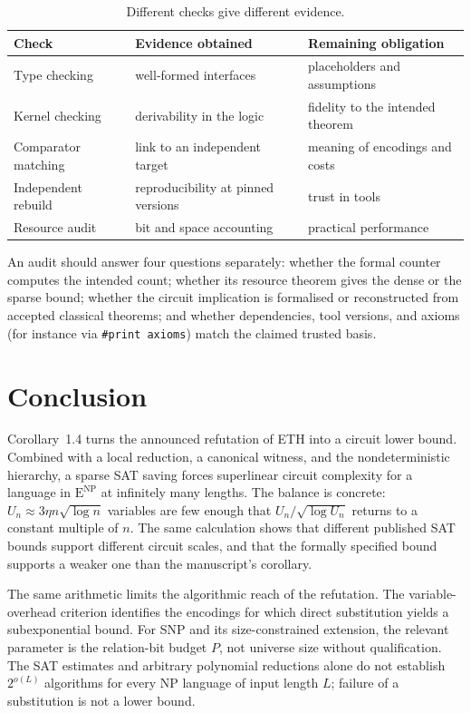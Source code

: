 \documentclass[11pt,reqno]{amsart}
\numberwithin{equation}{section}
\theoremstyle{plain}
\theoremstyle{definition}
\theoremstyle{remark}
\newcommand{\ENP}{\mathrm E^{\mathrm{NP}}}
\begin{document}
\begin{table}[htbp]
\caption{Different checks give different evidence.}
\small
\begin{tabularx}{\textwidth}{@{}lYY@{}}
\toprule
Check & Evidence obtained & Remaining obligation\\
\midrule
Type checking & well-formed interfaces & placeholders and assumptions\\
Kernel checking & derivability in the logic & fidelity to the intended theorem\\
Comparator matching & link to an independent target & meaning of encodings and costs\\
Independent rebuild & reproducibility at pinned versions & trust in tools\\
Resource audit & bit and space accounting & practical performance\\
\bottomrule
\end{tabularx}
\end{table}

An audit should answer four questions separately: whether the formal counter
computes the intended count; whether its resource theorem gives the dense or
the sparse bound; whether the circuit implication is formalised or
reconstructed from accepted classical theorems; and whether dependencies,
tool versions, and axioms (for instance via \texttt{\#print axioms}) match the
claimed trusted basis.


\section{Conclusion}
Corollary~1.4 turns the announced refutation of ETH into a circuit lower
bound. Combined with a local reduction, a canonical witness, and the
nondeterministic hierarchy, a sparse SAT saving forces superlinear circuit
complexity for a language in $\ENP$ at infinitely many lengths. The balance
is concrete: $U_n\approx3\eta n\sqrt{\log n}$ variables are few enough that
$U_n/\sqrt{\log U_n}$ returns to a constant multiple of $n$. The same
calculation shows that different published SAT bounds support different
circuit scales, and that the formally specified bound supports a weaker one
than the manuscript's corollary.

The same arithmetic limits the algorithmic reach of the refutation. The variable-overhead criterion identifies the encodings for which direct
substitution yields a subexponential bound. For SNP and its size-constrained
extension, the relevant parameter is the relation-bit budget $P$, not
universe size without qualification. The SAT estimates and arbitrary
polynomial reductions alone do not establish $2^{o(L)}$ algorithms for
every NP language of input length $L$; failure of a substitution is not a
lower bound.
\end{document}
